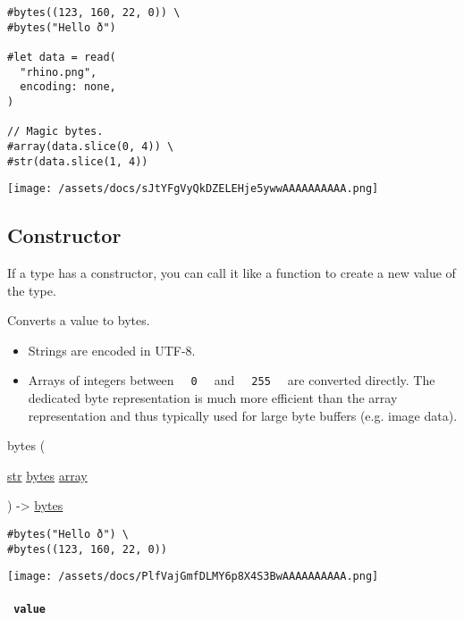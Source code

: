 \begin{verbatim}
#bytes((123, 160, 22, 0)) \
#bytes("Hello ð")

#let data = read(
  "rhino.png",
  encoding: none,
)

// Magic bytes.
#array(data.slice(0, 4)) \
#str(data.slice(1, 4))
\end{verbatim}

\texttt{[image: /assets/docs/sJtYFgVyQkDZELEHje5ywwAAAAAAAAAA.png]}

\subsection{\texorpdfstring{Constructor
{}}{Constructor }}\label{constructor}

\label{constructor-constructor-tooltip}
If a type has a constructor, you can call it like a function to create a
new value of the type.

Converts a value to bytes.

\begin{itemize}
\tightlist
\item
  Strings are encoded in UTF-8.
\item
  Arrays of integers between \texttt{\ }{\texttt{\ 0\ }}\texttt{\ } and
  \texttt{\ }{\texttt{\ 255\ }}\texttt{\ } are converted directly. The
  dedicated byte representation is much more efficient than the array
  representation and thus typically used for large byte buffers (e.g.
  image data).
\end{itemize}

{ bytes } (

{ \href{/docs/reference/foundations/str/}{str}
\href{/docs/reference/foundations/bytes/}{bytes}
\href{/docs/reference/foundations/array/}{array} }

) -\textgreater{} \href{/docs/reference/foundations/bytes/}{bytes}

\begin{verbatim}
#bytes("Hello ð") \
#bytes((123, 160, 22, 0))
\end{verbatim}

\texttt{[image: /assets/docs/PlfVajGmfDLMY6p8X4S3BwAAAAAAAAAA.png]}

\paragraph{\texorpdfstring{\texttt{\ value\ }}{ value }}\label{constructor-value}

